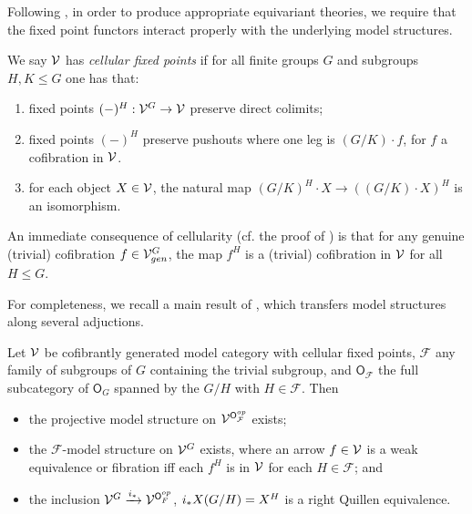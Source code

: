 \documentclass[a4paper,10pt
,draft
]{article}%
\renewcommand{\F}{\mathcal F}
\renewcommand{\1}{\eta}%
\begin{document}
Following \cite{Ste16, BP_geo}, in order to produce appropriate equivariant theories,
we require that the fixed point functors interact properly with the underlying model structures.
\begin{definition}
      \label{CELLFP_DEF}
      We say $\mathcal V$ has \textit{cellular fixed points} if
      for all finite groups $G$ and subgroups $H, K \leq G$ one has that:
      \begin{enumerate}[label = (\roman*)]
      \item fixed points $(-)^H: \mathcal V^G \to \mathcal V$ preserve direct colimits;
      \item fixed points $(-)^H$ preserve pushouts where one leg is $(G/K) \cdot f$, for $f$ a cofibration in $\mathcal V$.
      \item for each object $X \in \mathcal V$, the natural map $(G/K)^H \cdot X \to ((G/K) \cdot X)^H$ is an isomorphism.
      \end{enumerate}
\end{definition}

\begin{remark}
      \label{LEVEL_COF_REM}
      An immediate consequence of cellularity (cf. the proof of \cite[Prop. 6.3(i)]{BP_geo})
      is that for any genuine (trivial) cofibration $f \in \mathcal V^G_{gen}$,
      the map $f^H$ is a (trivial) cofibration in $\mathcal V$ for all $H \leq G$.
\end{remark}


For completeness, we recall a main result of \cite{Ste16}, which transfers model structures along several adjuctions.
\begin{theorem}
      Let $\mathcal V$ be cofibrantly generated model category with cellular fixed points, $\F$ any family of subgroups of $G$ containing the trivial subgroup, and $\mathsf O_\F$ the full subcategory of $\mathsf O_G$ spanned by the $G/H$ with $H \in \F$.
      Then
      \begin{itemize}
      \item the projective model structure on $\V^{\mathsf O_\F^{op}}$ exists;
      \item the $\F$-model structure on $\mathcal V^G$ exists, where an arrow $f \in \mathcal V$ is a weak equivalence or fibration iff each $f^H$ is in $\mathcal V$ for each $H \in \F$; and
      \item the inclusion $\V^G \xrightarrow{i_{\**}} \V^{\mathsf O_F^{op}}$, $i_{\**}X(G/H) = X^H$ is a right Quillen equivalence.
      \end{itemize}
\end{theorem}      
\end{document}
